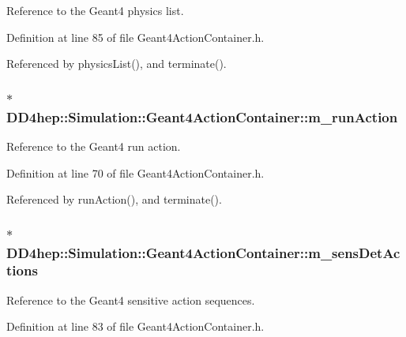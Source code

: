 Reference to the Geant4 physics list. 

Definition at line 85 of file Geant4ActionContainer.h.

Referenced by physicsList(), and terminate().\hypertarget{class_d_d4hep_1_1_simulation_1_1_geant4_action_container_a627339c1dc5e85a432170b010abd3505}{
\subsubsection[{m\_\-runAction}]{$\ast$ {\bf DD4hep::Simulation::Geant4ActionContainer::m\_\-runAction}}}
\label{class_d_d4hep_1_1_simulation_1_1_geant4_action_container_a627339c1dc5e85a432170b010abd3505}


Reference to the Geant4 run action. 

Definition at line 70 of file Geant4ActionContainer.h.

Referenced by runAction(), and terminate().\hypertarget{class_d_d4hep_1_1_simulation_1_1_geant4_action_container_ae9a092ff4aa75024c19b392f227abdef}{
\subsubsection[{m\_\-sensDetActions}]{$\ast$ {\bf DD4hep::Simulation::Geant4ActionContainer::m\_\-sensDetActions}}}
\label{class_d_d4hep_1_1_simulation_1_1_geant4_action_container_ae9a092ff4aa75024c19b392f227abdef}


Reference to the Geant4 sensitive action sequences. 

Definition at line 83 of file Geant4ActionContainer.h.

